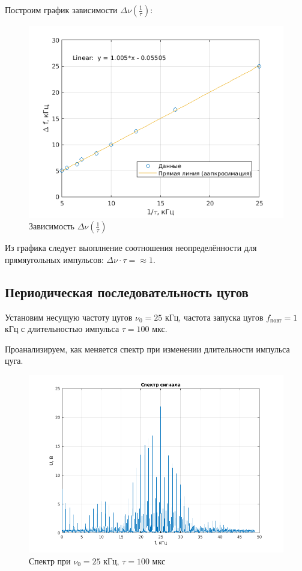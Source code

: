 Построим график зависимости $\Delta \nu (\frac{1}{\tau})$:

\begin{figure}[h!]
    \centering
    \includegraphics[width = 13 cm]{images/1_appr.png}
    \caption{Зависимость $\Delta \nu (\frac{1}{\tau})$}
\end{figure}

Из графика следует выоплнение соотношения неопределённости для прямяугольных импульсов: $\Delta \nu \cdot \tau = \approx 1$.

\subsection{Периодическая последовательность цугов}

Установим несущую частоту цугов $\nu_0 = 25$ кГц, частота запуска цугов $f_{\text{повт}} = 1$ кГц с длительностью импульса $\tau = 100$ мкс.

Проанализируем, как меняется спектр при изменении длительности импульса цуга.

\begin{figure}[h!]
    \centering
    \includegraphics[width = 14 cm]{images/2_100_1.png}
    \caption{Спектр при $\nu_0 = 25$ кГц, $\tau = 100$ мкс}
\end{figure}

